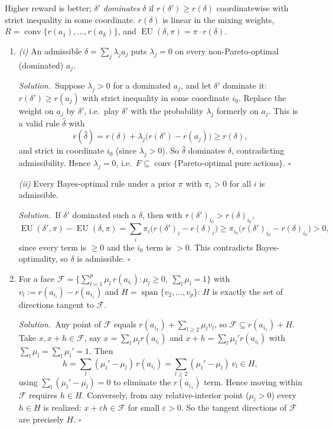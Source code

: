 \documentclass[11pt]{article}
\newcommand{\rd}{r(\delta)}
\DeclareMathOperator{\EU}{EU}
\newcommand{\soln}{\medskip\noindent\textit{Solution.}\ }
\renewcommand{\qed}{\ensuremath{\square}}
\begin{document}
\begin{solution}
Higher reward is better; $\delta'$ \emph{dominates} $\delta$ if $r(\delta')\ge\rd$ coordinatewise with strict inequality in some coordinate. $\rd$ is linear in the mixing weights, $R=\operatorname{conv}\{r(a_1),\dots,r(a_k)\}$, and $\EU(\delta,\pi)=\pi\cdot\rd$.

\begin{enumerate}
\item \emph{(i)} An admissible $\delta=\sum_j\lambda_j a_j$ puts $\lambda_j=0$ on every non-Pareto-optimal (dominated) $a_j$.

\soln Suppose $\lambda_j>0$ for a dominated $a_j$, and let $\delta'$ dominate it: $r(\delta')\ge r(a_j)$ with strict inequality in some coordinate $i_0$. Replace the weight on $a_j$ by $\delta'$, i.e.\ play $\delta'$ with the probability $\lambda_j$ formerly on $a_j$. This is a valid rule $\hat\delta$ with
\[
  r(\hat\delta)=\rd+\lambda_j\big(r(\delta')-r(a_j)\big)\ge\rd,
\]
and strict in coordinate $i_0$ (since $\lambda_j>0$). So $\hat\delta$ dominates $\delta$, contradicting admissibility. Hence $\lambda_j=0$, i.e.\ $F\subseteq\operatorname{conv}\{\text{Pareto-optimal pure actions}\}$. \qed

\emph{(ii)} Every Bayes-optimal rule under a prior $\pi$ with $\pi_i>0$ for all $i$ is admissible.

\soln If $\delta'$ dominated such a $\delta$, then with $r(\delta')_{i_0}>\rd_{i_0}$,
\[
  \EU(\delta',\pi)-\EU(\delta,\pi)=\sum_i\pi_i\big(r(\delta')_i-\rd_i\big)\ge\pi_{i_0}\big(r(\delta')_{i_0}-\rd_{i_0}\big)>0,
\]
since every term is $\ge0$ and the $i_0$ term is $>0$. This contradicts Bayes-optimality, so $\delta$ is admissible. \qed

\item For a face $\mathcal F=\{\sum_{l=1}^p\mu_l\,r(a_{i_l}):\mu_l\ge0,\ \sum_l\mu_l=1\}$ with $v_l:=r(a_{i_l})-r(a_{i_1})$ and $H=\operatorname{span}\{v_2,\dots,v_p\}$: $H$ is exactly the set of directions tangent to $\mathcal F$.

\soln Any point of $\mathcal F$ equals $r(a_{i_1})+\sum_{l\ge2}\mu_l v_l$, so $\mathcal F\subseteq r(a_{i_1})+H$. Take $x,x+h\in\mathcal F$, say $x=\sum_l\mu_l r(a_{i_l})$ and $x+h=\sum_l\mu_l' r(a_{i_l})$ with $\sum_l\mu_l=\sum_l\mu_l'=1$. Then
\[
  h=\sum_l(\mu_l'-\mu_l)\,r(a_{i_l})=\sum_{l\ge2}(\mu_l'-\mu_l)\,v_l\in H,
\]
using $\sum_l(\mu_l'-\mu_l)=0$ to eliminate the $r(a_{i_1})$ term. Hence moving within $\mathcal F$ requires $h\in H$. Conversely, from any relative-interior point ($\mu_l>0$) every $h\in H$ is realized: $x+\varepsilon h\in\mathcal F$ for small $\varepsilon>0$. So the tangent directions of $\mathcal F$ are precisely $H$. \qed


\end{enumerate}
\end{solution}
\end{document}
